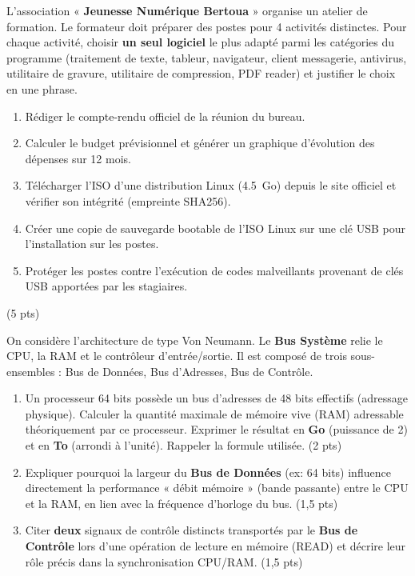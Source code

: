 \documentclass[11pt]{article}
\begin{document}
\begin{exercice}
L'association « \textbf{Jeunesse Numérique Bertoua} » organise un atelier de formation. Le formateur doit préparer des postes pour 4 activités distinctes. Pour chaque activité, choisir \textbf{un seul logiciel} le plus adapté parmi les catégories du programme (traitement de texte, tableur, navigateur, client messagerie, antivirus, utilitaire de gravure, utilitaire de compression, PDF reader) et justifier le choix en une phrase.
\begin{enumerate}
    \item Rédiger le compte-rendu officiel de la réunion du bureau.
    \item Calculer le budget prévisionnel et générer un graphique d'évolution des dépenses sur 12 mois.
    \item Télécharger l'ISO d'une distribution Linux (\SI{4,5}{Go}) depuis le site officiel et vérifier son intégrité (empreinte SHA256).
    \item Créer une copie de sauvegarde bootable de l'ISO Linux sur une clé USB pour l'installation sur les postes.
    \item Protéger les postes contre l'exécution de codes malveillants provenant de clés USB apportées par les stagiaires.
\end{enumerate}
(5 pts)
\end{exercice}

\begin{exercice}
On considère l'architecture de type Von Neumann. Le \textbf{Bus Système} relie le CPU, la RAM et le contrôleur d'entrée/sortie. Il est composé de trois sous-ensembles : Bus de Données, Bus d'Adresses, Bus de Contrôle.
\begin{enumerate}
    \item Un processeur 64 bits possède un bus d'adresses de 48 bits effectifs (adressage physique). Calculer la quantité maximale de mémoire vive (RAM) adressable théoriquement par ce processeur. Exprimer le résultat en \textbf{Go} (puissance de 2) et en \textbf{To} (arrondi à l'unité). Rappeler la formule utilisée. (2 pts)
    \item Expliquer pourquoi la largeur du \textbf{Bus de Données} (ex: 64 bits) influence directement la performance « débit mémoire » (bande passante) entre le CPU et la RAM, en lien avec la fréquence d'horloge du bus. (1,5 pts)
    \item Citer \textbf{deux} signaux de contrôle distincts transportés par le \textbf{Bus de Contrôle} lors d'une opération de lecture en mémoire (READ) et décrire leur rôle précis dans la synchronisation CPU/RAM. (1,5 pts)
\end{enumerate}
\end{exercice}
\end{document}
